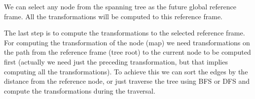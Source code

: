We can select any node from the spanning tree as the future global reference frame. All the transformations will be computed to this reference frame.

The last step is to compute the transformations to the selected reference frame. For computing the transformation of the node (map) we need transformations on the path from the reference frame (tree root) to the current node to be computed first (actually we need just the preceding transformation, but that implies computing all the transformations). To achieve this we can sort the edges by the distance from the reference node, or just traverse the tree using \gls{BFS} or \gls{DFS} and compute the transformations during the traversal.


